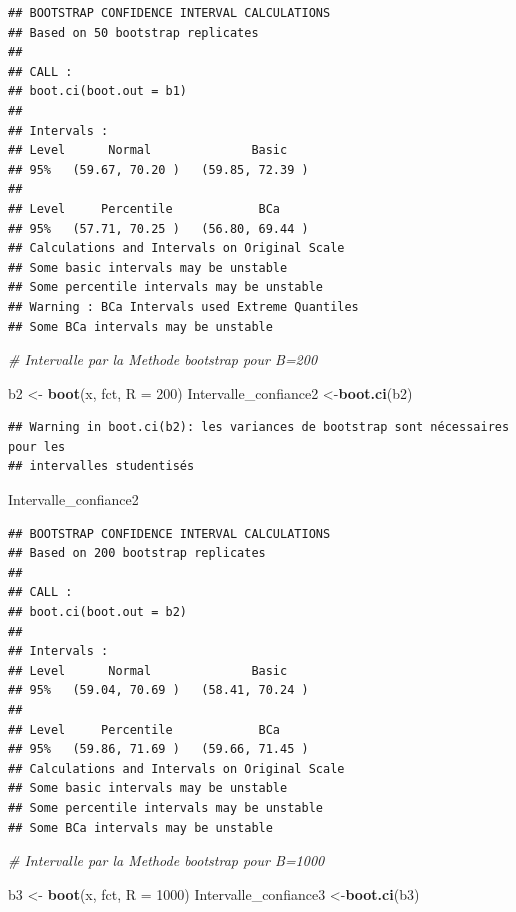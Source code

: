 \documentclass[
]{article}
\newenvironment{Shaded}{\begin{snugshade}}{\end{snugshade}}
\newcommand{\AttributeTok}[1]{\textcolor[rgb]{0.13,0.29,0.53}{#1}}
\newcommand{\CommentTok}[1]{\textcolor[rgb]{0.56,0.35,0.01}{\textit{#1}}}
\newcommand{\DecValTok}[1]{\textcolor[rgb]{0.00,0.00,0.81}{#1}}
\newcommand{\FunctionTok}[1]{\textcolor[rgb]{0.13,0.29,0.53}{\textbf{#1}}}
\newcommand{\NormalTok}[1]{#1}
\newcommand{\OtherTok}[1]{\textcolor[rgb]{0.56,0.35,0.01}{#1}}
\begin{document}
\begin{verbatim}
## BOOTSTRAP CONFIDENCE INTERVAL CALCULATIONS
## Based on 50 bootstrap replicates
## 
## CALL : 
## boot.ci(boot.out = b1)
## 
## Intervals : 
## Level      Normal              Basic         
## 95%   (59.67, 70.20 )   (59.85, 72.39 )  
## 
## Level     Percentile            BCa          
## 95%   (57.71, 70.25 )   (56.80, 69.44 )  
## Calculations and Intervals on Original Scale
## Some basic intervals may be unstable
## Some percentile intervals may be unstable
## Warning : BCa Intervals used Extreme Quantiles
## Some BCa intervals may be unstable
\end{verbatim}

\begin{Shaded}
\begin{Highlighting}[]
 \CommentTok{\# Intervalle par la Methode bootstrap pour B=200}

\NormalTok{b2 }\OtherTok{\textless{}{-}} \FunctionTok{boot}\NormalTok{(x, fct, }\AttributeTok{R =} \DecValTok{200}\NormalTok{)}
\NormalTok{Intervalle\_confiance2 }\OtherTok{\textless{}{-}}\FunctionTok{boot.ci}\NormalTok{(b2)}
\end{Highlighting}
\end{Shaded}

\begin{verbatim}
## Warning in boot.ci(b2): les variances de bootstrap sont nécessaires pour les
## intervalles studentisés
\end{verbatim}

\begin{Shaded}
\begin{Highlighting}[]
\NormalTok{Intervalle\_confiance2}
\end{Highlighting}
\end{Shaded}

\begin{verbatim}
## BOOTSTRAP CONFIDENCE INTERVAL CALCULATIONS
## Based on 200 bootstrap replicates
## 
## CALL : 
## boot.ci(boot.out = b2)
## 
## Intervals : 
## Level      Normal              Basic         
## 95%   (59.04, 70.69 )   (58.41, 70.24 )  
## 
## Level     Percentile            BCa          
## 95%   (59.86, 71.69 )   (59.66, 71.45 )  
## Calculations and Intervals on Original Scale
## Some basic intervals may be unstable
## Some percentile intervals may be unstable
## Some BCa intervals may be unstable
\end{verbatim}

\begin{Shaded}
\begin{Highlighting}[]
 \CommentTok{\# Intervalle par la Methode bootstrap pour B=1000}

\NormalTok{b3 }\OtherTok{\textless{}{-}} \FunctionTok{boot}\NormalTok{(x, fct, }\AttributeTok{R =} \DecValTok{1000}\NormalTok{)}
\NormalTok{Intervalle\_confiance3 }\OtherTok{\textless{}{-}}\FunctionTok{boot.ci}\NormalTok{(b3)}
\end{Highlighting}
\end{Shaded}
\end{document}
